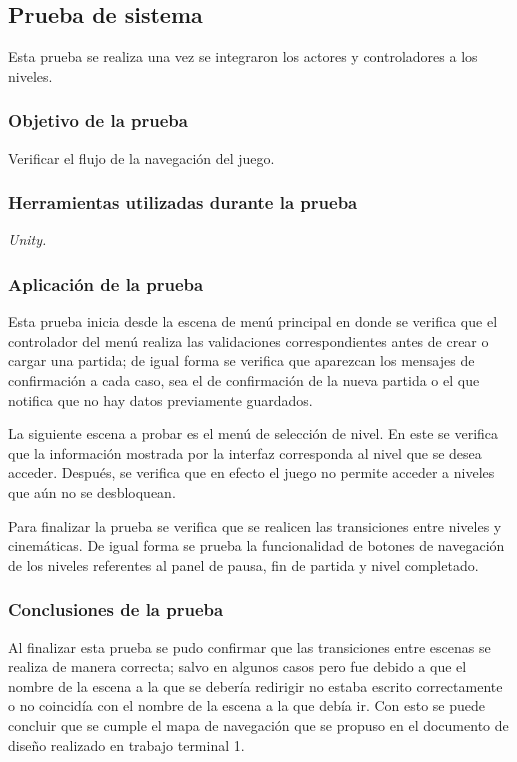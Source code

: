 \subsection{Prueba de sistema}
Esta prueba se realiza una vez se integraron los actores y controladores a los
niveles.
\subsubsection{Objetivo de la prueba}
Verificar el flujo de la navegación del juego.
\subsubsection{Herramientas utilizadas durante la prueba}
\textit{Unity.}
\subsubsection{Aplicación de la prueba}
Esta prueba inicia desde la escena de menú principal en donde se verifica que
el controlador del menú realiza las validaciones correspondientes antes de
crear o cargar una partida; de igual forma se verifica que aparezcan los
mensajes de confirmación a cada caso, sea el de confirmación de la nueva partida
o el que notifica que no hay datos previamente guardados.
\\
\par
La siguiente escena a probar es el menú de selección de nivel. En este se verifica
que la información mostrada por la interfaz corresponda al nivel que se desea
acceder. Después, se verifica que en efecto el juego no permite acceder a niveles
que aún no se desbloquean.
\\
\par
Para finalizar la prueba se verifica que se realicen las transiciones entre
niveles y cinemáticas. De igual forma se prueba la funcionalidad de botones de
navegación de los niveles referentes al panel de pausa, fin de partida y nivel
completado.
\subsubsection{Conclusiones de la prueba}
Al finalizar esta prueba se pudo confirmar que las transiciones entre escenas se
realiza de manera correcta; salvo en algunos casos pero fue debido a que el nombre
de la escena a la que se debería redirigir no estaba escrito correctamente o no
coincidía con el nombre de la escena a la que debía ir. Con esto se puede concluir
que se cumple el mapa de navegación que se propuso en el documento de diseño
realizado en trabajo terminal 1.

